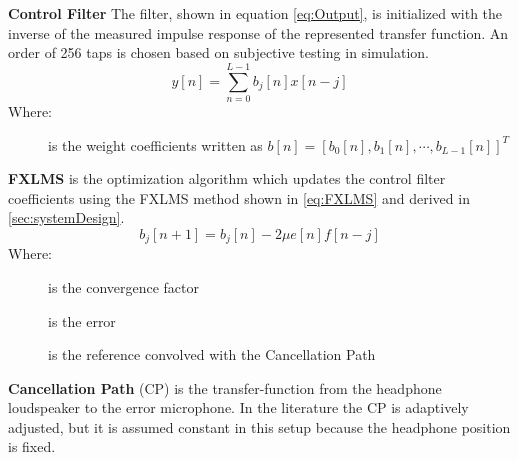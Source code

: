 

\textbf{Control Filter} The filter, shown in equation \ref{eq:Output}, is initialized with the inverse of the measured impulse response of the represented transfer function. An order of 256 taps is chosen based on subjective testing in simulation.
\vspace{-3mm} %
\begin{equation}\label{eq:Output}
y[n]=\sum_{n=0}^{L-1}b_j[n]x[n-j]
\end{equation}
Where:
\vspace{-7mm} %
\begin{description}
	\item[] is the weight coefficients written as  $b[n]=[b_0[n],b_1[n], \cdots, b_{L-1}[n]]^T$
\end{description}

\textbf{FXLMS} is the optimization algorithm which updates the control filter coefficients using the FXLMS method shown in \autoref{eq:FXLMS} and derived in \autoref{sec:systemDesign}. 
\begin{equation}\label{eq:FXLMS}
b_j[n+1] = b_j[n] - 2\mu e[n]f[n-j]
\end{equation}
Where:
\vspace{-8mm} %
\begin{description}
	\item[\text{$\mu$}] is the convergence factor
	\item[] is the error 
	\item[] is the reference convolved with the Cancellation Path
\end{description}

\textbf{Cancellation Path} (CP) is the transfer-function from the headphone loudspeaker to the error microphone. In the literature \cite{Hansen} the CP is adaptively adjusted, but it is assumed constant in this setup because the headphone position is fixed.     



